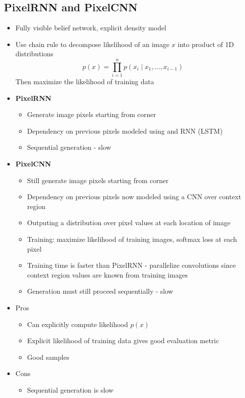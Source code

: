 \subsection{PixelRNN and PixelCNN}
\begin{itemize}
	\item Fully visible belief network, explicit density model
	\item Use chain rule to decompose likelihood of an image $x$ into product of 1D distributions
	$$p(x) = \prod_{i=1}^n p(x_i\mid x_1, \dots, x_{i-1})$$
	Then maximize the likelihood of training data
	\item \textbf{PixelRNN}
	\begin{itemize}
		\item Generate image pixels starting from corner
		\item Dependency on previous pixels modeled using and RNN (LSTM)
		\item Sequential generation - slow
	\end{itemize}
	\item \textbf{PixelCNN}
	\begin{itemize}
		\item Still generate image pixels starting from corner
		\item Dependency on previous pixels now modeled using a CNN over context region
		\item Outputing a distribution over pixel values at each location of image
		\item Training: maximize likelihood of training images, softmax loss at each pixel
		\item Training time is faster than PixelRNN - parallelize convolutions since context region values are known from training images
		\item Generation must still proceed sequentially - slow
	\end{itemize}
	\item Pros
	\begin{itemize}
		\item Can explicitly compute likelihood $p(x)$
		\item Explicit likelihood of training data gives good evaluation metric
		\item Good samples
	\end{itemize}
	\item Cons
	\begin{itemize}
		\item Sequential generation is slow
	\end{itemize}
\end{itemize}

